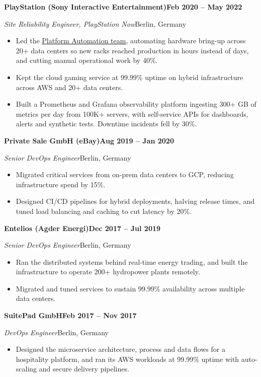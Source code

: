 \documentclass[10pt,a4paper]{article}
\newcommand{\job}[4]{%
  \par\addvspace{0.9ex}%
  {\bfseries #1}\hfill{\bfseries #2}\par
  {\itshape #3}\hfill{\color{muted}#4}\par}
\begin{document}
\job{PlayStation (Sony Interactive Entertainment)}{Feb 2020 -- May 2022}{Site Reliability Engineer, PlayStation Now}{Berlin, Germany}
\begin{itemize}
  \item Led the \href{https://rajatgupta.work/projects/platform-automation-observability/}{Platform Automation team}, automating hardware bring-up across 20+ data centers so new racks reached production in hours instead of days, and cutting manual operational work by 40\%.
  \item Kept the cloud gaming service at 99.99\% uptime on hybrid infrastructure across AWS and 20+ data centers.
  \item Built a Prometheus and Grafana observability platform ingesting 300+ GB of metrics per day from 100K+ servers, with self-service APIs for dashboards, alerts and synthetic tests. Downtime incidents fell by 30\%.
\end{itemize}

\job{Private Sale GmbH (eBay)}{Aug 2019 -- Jan 2020}{Senior DevOps Engineer}{Berlin, Germany}
\begin{itemize}
  \item Migrated critical services from on-prem data centers to GCP, reducing infrastructure spend by 15\%.
  \item Designed CI/CD pipelines for hybrid deployments, halving release times, and tuned load balancing and caching to cut latency by 20\%.
\end{itemize}

\job{Entelios (Agder Energi)}{Dec 2017 -- Jul 2019}{Senior DevOps Engineer}{Berlin, Germany}
\begin{itemize}
  \item Ran the distributed systems behind real-time energy trading, and built the infrastructure to operate 200+ hydropower plants remotely.
  \item Migrated and tuned services to sustain 99.99\% availability across multiple data centers.
\end{itemize}

\job{SuitePad GmbH}{Feb 2017 -- Nov 2017}{DevOps Engineer}{Berlin, Germany}
\begin{itemize}
  \item Designed the microservice architecture, process and data flows for a hospitality platform, and ran its AWS workloads at 99.99\% uptime with auto-scaling and secure delivery pipelines.
\end{itemize}
\end{document}
